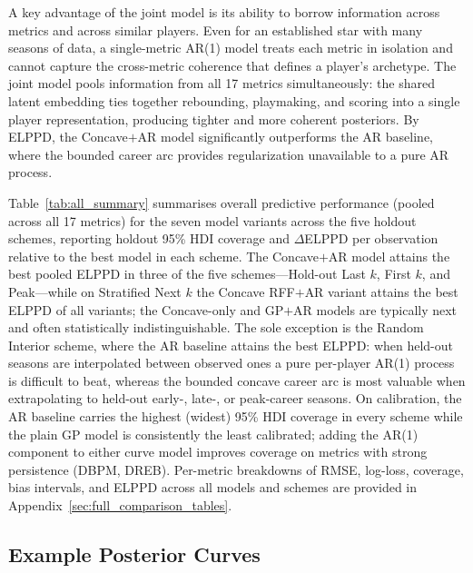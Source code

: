 \documentclass[aoas]{imsart}
\begin{document}
% 


A key advantage of the joint model is its ability to borrow information across metrics and across similar players.
Even for an established star with many seasons of data, a single-metric AR(1) model treats each metric in isolation and cannot capture the cross-metric coherence that defines a player's archetype.
The joint model pools information from all 17 metrics simultaneously: the shared latent embedding ties together rebounding, playmaking, and scoring into a single player representation, producing tighter and more coherent posteriors. By ELPPD, the Concave$+$AR model significantly outperforms the AR baseline, where the bounded career arc provides regularization unavailable to a pure AR process.

Table~\ref{tab:all_summary} summarises overall predictive performance (pooled across all 17 metrics) for the seven model variants across the five holdout schemes, reporting holdout 95\% HDI coverage and $\Delta$ELPPD per observation relative to the best model in each scheme.
The Concave$+$AR model attains the best pooled ELPPD in three of the five schemes---Hold-out Last $k$, First $k$, and Peak---while on Stratified Next $k$ the Concave RFF$+$AR variant attains the best ELPPD of all variants; the Concave-only and GP$+$AR models are typically next and often statistically indistinguishable.
The sole exception is the Random Interior scheme, where the AR baseline attains the best ELPPD: when held-out seasons are interpolated between observed ones a pure per-player AR(1) process is difficult to beat, whereas the bounded concave career arc is most valuable when extrapolating to held-out early-, late-, or peak-career seasons.
On calibration, the AR baseline carries the highest (widest) 95\% HDI coverage in every scheme while the plain GP model is consistently the least calibrated; adding the AR(1) component to either curve model improves coverage on metrics with strong persistence (DBPM, DREB).
Per-metric breakdowns of RMSE, log-loss, coverage, bias intervals, and ELPPD across all models and schemes are provided in Appendix~\ref{sec:full_comparison_tables}.









\subsection{Example Posterior Curves}
\end{document}
